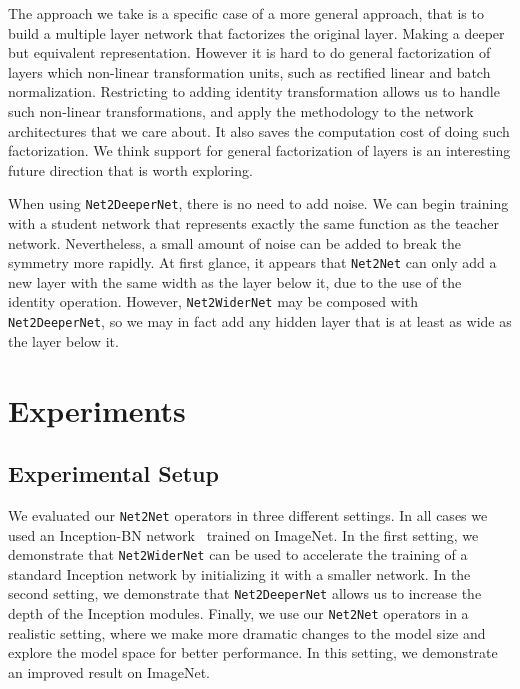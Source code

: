 \documentclass{article} %
\begin{document}
The approach we take is a specific case of a more general approach, that is to
build a multiple layer network that factorizes the original layer. Making
a deeper but equivalent representation. However it is hard to do general factorization
of layers which non-linear transformation units, such as rectified linear and batch normalization.
Restricting to adding identity transformation allows us to handle such non-linear transformations,
and apply the methodology to the network architectures that we care about. It also
saves the computation cost of doing such factorization. We think support for general factorization
of layers is an interesting future direction that is worth exploring.

When using {\tt Net2DeeperNet}, there is no need to add noise. We can begin
training with a student network that represents exactly the same function
as the teacher network. Nevertheless, a small amount of noise can be added to break the symmetry more rapidly.
At first glance, it appears that {\tt Net2Net} can only add a new layer
with the same width as the layer below it, due to the use of the identity
operation. However, {\tt Net2WiderNet} may be composed with {\tt Net2DeeperNet},
so we may in fact add any hidden layer that is at least as wide as the
layer below it.

\section{Experiments}
\subsection{Experimental Setup}
We evaluated our {\tt Net2Net} operators in three different settings.
In all cases we used an Inception-BN network~\citep{Ioffe+Szegedy-2015} trained on ImageNet.
In the first setting, we demonstrate that {\tt Net2WiderNet}
can be used to accelerate the training of a standard Inception
network by initializing it with a smaller network.
In the second setting, we demonstrate that {\tt Net2DeeperNet} allows us
to increase the depth of the Inception modules.
Finally, we use our {\tt Net2Net} operators in a realistic setting,
where we make more dramatic changes to the model size and explore
the model space for better performance. In this setting, we demonstrate
an improved result on ImageNet.
\end{document}
